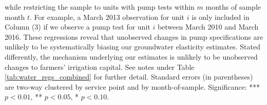 \begin{table}[t!]
{while restricting the sample to units with pump tests within $m$ months of sample month $t$. 
For example, a March 2013 observation for unit $i$ is only included in Column (3) if we observe 
a pump test for unit $i$ between March 2010 and March 2016. 
These regressions reveal that unobserved changes in pump specifications are unlikely to be systematically biasing our 
groundwater elasticity estimates. Stated differently, the mechanism underlying our estimates is unlikely to be 
unobserved changes to farmers' irrigation capital. 
See notes under Table \ref{tab:water_regs_combined} for further detail. 
Standard errors (in parentheses) are two-way clustered by service point and by month-of-sample.
Significance: *** $p < 0.01$, ** $p < 0.05$, * $p < 0.10$.
}
\end{table}
